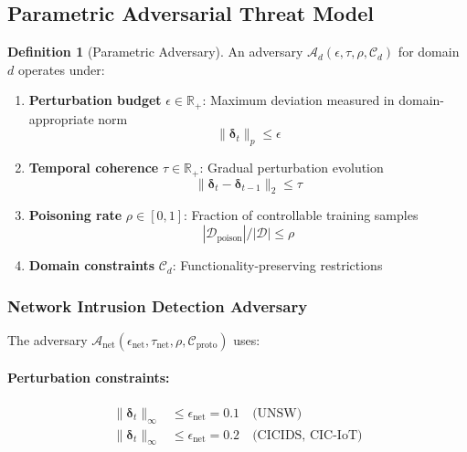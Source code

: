 \documentclass[12pt,a4paper]{article}
\theoremstyle{definition}
\newtheorem{definition}[theorem]{Definition}
\newcommand{\Anet}{\mathcal{A}_{\text{net}}}
\begin{document}
\subsection{Parametric Adversarial Threat Model}

\begin{definition}[Parametric Adversary]
\label{def:parametric_adv}
An adversary $\mathcal{A}_d(\epsilon, \tau, \rho, \mathcal{C}_d)$ for domain $d$ operates under:
\begin{enumerate}
\item \textbf{Perturbation budget} $\epsilon \in \mathbb{R}_+$: Maximum deviation measured in domain-appropriate norm
\begin{equation}
\|\bm{\delta}_t\|_p \leq \epsilon
\end{equation}

\item \textbf{Temporal coherence} $\tau \in \mathbb{R}_+$: Gradual perturbation evolution
\begin{equation}
\|\bm{\delta}_t - \bm{\delta}_{t-1}\|_2 \leq \tau
\end{equation}

\item \textbf{Poisoning rate} $\rho \in [0, 1]$: Fraction of controllable training samples
\begin{equation}
|\mathcal{D}_{\text{poison}}| / |\mathcal{D}| \leq \rho
\end{equation}

\item \textbf{Domain constraints} $\mathcal{C}_d$: Functionality-preserving restrictions
\end{enumerate}
\end{definition}

\subsubsection{Network Intrusion Detection Adversary}

The adversary $\Anet(\epsilon_{\text{net}}, \tau_{\text{net}}, \rho, \mathcal{C}_{\text{proto}})$ uses:

\paragraph{Perturbation constraints:}
\begin{align}
\|\bm{\delta}_t\|_\infty &\leq \epsilon_{\text{net}} = 0.1 \quad \text{(UNSW)} \\
\|\bm{\delta}_t\|_\infty &\leq \epsilon_{\text{net}} = 0.2 \quad \text{(CICIDS, CIC-IoT)}
\end{align}
\end{document}
